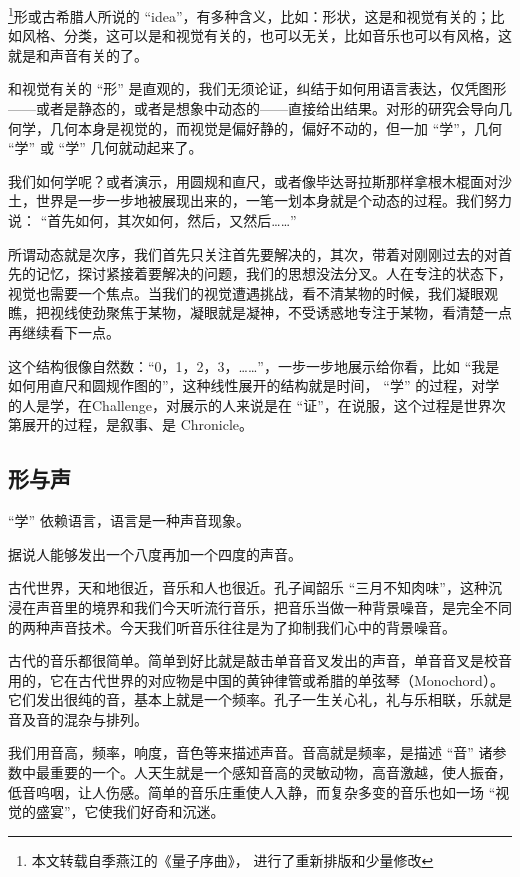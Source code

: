 
\footnote{本文转载自季燕江的《量子序曲》， 进行了重新排版和少量修改}形或古希腊人所说的 “idea”，有多种含义，比如：形状，这是和视觉有关的；比如风格、分类，这可以是和视觉有关的，也可以无关，比如音乐也可以有风格，这就是和声音有关的了。

和视觉有关的 “形” 是直观的，我们无须论证，纠结于如何用语言表达，仅凭图形——或者是静态的，或者是想象中动态的——直接给出结果。对形的研究会导向几何学，几何本身是视觉的，而视觉是偏好静的，偏好不动的，但一加 “学”，几何 “学” 或 “学” 几何就动起来了。

我们如何学呢？或者演示，用圆规和直尺，或者像毕达哥拉斯那样拿根木棍面对沙土，世界是一步一步地被展现出来的，一笔一划本身就是个动态的过程。我们努力说： “首先如何，其次如何，然后，又然后……”

所谓动态就是次序，我们首先只关注首先要解决的，其次，带着对刚刚过去的对首先的记忆，探讨紧接着要解决的问题，我们的思想没法分叉。人在专注的状态下，视觉也需要一个焦点。当我们的视觉遭遇挑战，看不清某物的时候，我们凝眼观瞧，把视线使劲聚焦于某物，凝眼就是凝神，不受诱惑地专注于某物，看清楚一点再继续看下一点。

这个结构很像自然数：“0，1，2，3，……”，一步一步地展示给你看，比如 “我是如何用直尺和圆规作图的”，这种线性展开的结构就是时间， “学” 的过程，对学的人是学，在Challenge，对展示的人来说是在 “证”，在说服，这个过程是世界次第展开的过程，是叙事、是 Chronicle。

\subsection{形与声}

“学” 依赖语言，语言是一种声音现象。

据说人能够发出一个八度再加一个四度的声音。

古代世界，天和地很近，音乐和人也很近。孔子闻韶乐 “三月不知肉味”，这种沉浸在声音里的境界和我们今天听流行音乐，把音乐当做一种背景噪音，是完全不同的两种声音技术。今天我们听音乐往往是为了抑制我们心中的背景噪音。

古代的音乐都很简单。简单到好比就是敲击单音音叉发出的声音，单音音叉是校音用的，它在古代世界的对应物是中国的黄钟律管或希腊的单弦琴（Monochord）。它们发出很纯的音，基本上就是一个频率。孔子一生关心礼，礼与乐相联，乐就是音及音的混杂与排列。

我们用音高，频率，响度，音色等来描述声音。音高就是频率，是描述 “音” 诸参数中最重要的一个。人天生就是一个感知音高的灵敏动物，高音激越，使人振奋，低音呜咽，让人伤感。简单的音乐庄重使人入静，而复杂多变的音乐也如一场 “视觉的盛宴”，它使我们好奇和沉迷。

